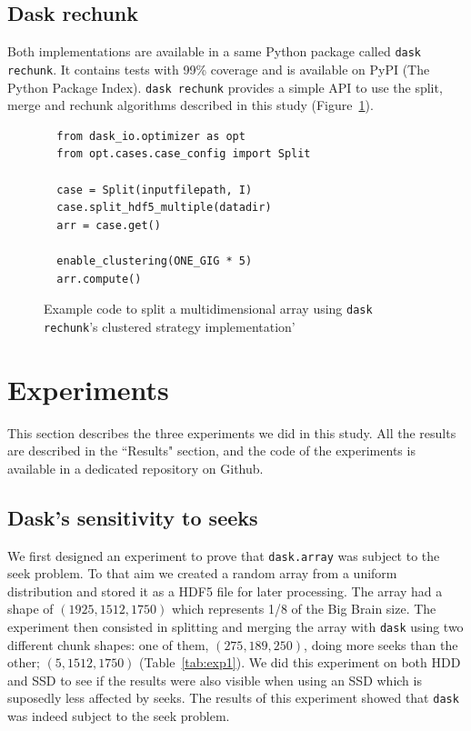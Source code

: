 \documentclass[conference]{IEEEtran}
\begin{document}
\subsection{Dask rechunk}

Both implementations are available in a same Python package called \texttt{dask rechunk}. It
contains tests with 99\% coverage and is available on PyPI (The Python Package
Index). \texttt{dask rechunk} provides a simple API to use the split, merge and rechunk
algorithms described in this study (Figure~\ref{fig:daskrechunk_split}).

\begin{figure}
  \begin{verbatim}
  from dask_io.optimizer as opt
  from opt.cases.case_config import Split

  case = Split(inputfilepath, I)
  case.split_hdf5_multiple(datadir)
  arr = case.get()

  enable_clustering(ONE_GIG * 5)
  arr.compute()
  \end{verbatim}
  \caption{Example code to split a multidimensional array using \texttt{dask rechunk}'s clustered strategy implementation'}
  \label{fig:daskrechunk_split}
\end{figure}


\section{Experiments}
This section describes the three experiments we did in this study. All the
results are described in the ``Results" section, and the code of the experiments
is available in a dedicated repository on Github.

\subsection{Dask's sensitivity to seeks}
We first designed
an experiment to prove that \texttt{dask.array} was subject to the seek problem.
To that aim we created a random array from a uniform distribution and stored it
as a HDF5 file for later processing. The array had a shape of
$(1925, 1512, 1750)$ which represents 1/8
of the Big Brain size. The experiment then consisted in splitting and merging
the array with \texttt{dask} using two different chunk shapes: one of them,
$(275,189,250)$, doing more seeks than the other; $(5,1512,1750)$
(Table~\ref{tab:exp1}). We did this experiment on both HDD and SSD to see if the
results were also visible when using an SSD which is suposedly less affected by
seeks. The results of this experiment showed that \texttt{dask} was indeed
subject to the seek problem.
\end{document}
